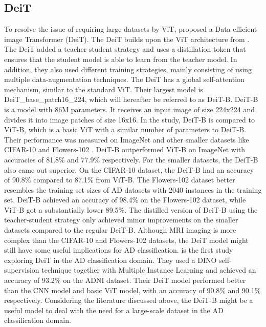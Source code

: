 \documentclass[11pt, a4paper]{article}
\begin{document}
\subsection{DeiT} \label{subs:deit}
To resolve the issue of requiring large datasets by ViT, \cite{Touvron2021TrainingAttention} proposed a Data efficient image Transformer (DeiT). The DeiT builds upon the ViT architecture from \cite{Dosovitskiy2020AnScale}. The DeiT added a teacher-student strategy and uses a distillation token that ensures that the student model is able to learn from the teacher model. In addition, they also used different training strategies, mainly consisting of using multiple data-augmentation techniques. The DeiT has a global self-attention mechanism, similar to the standard ViT. Their largest model is DeiT\_base\_patch16\_224, which will hereafter be referred to as DeiT-B. DeiT-B is a model with 86M parameters. It receives an input image of size 224x224 and divides it into image patches of size 16x16. In the study, DeiT-B is compared to ViT-B, which is a basic ViT with a similar number of parameters to DeiT-B. Their performance was measured on ImageNet and other smaller datasets like CIFAR-10 and Flowers-102 \citep{Krizhevsky2009LearningImages,Nilsback2008AutomatedClasses}. DeiT-B outperformed ViT-B on ImageNet with accuracies of 81.8\% and 77.9\% respectively. For the smaller datasets, the DeiT-B also came out superior. On the CIFAR-10 dataset, the DeiT-B had an accuracy of 90.8\% compared to 87.1\% from ViT-B. The Flowers-102 dataset better resembles the training set sizes of AD datasets with 2040 instances in the training set. DeiT-B achieved an accuracy of 98.4\% on the Flowers-102 dataset, while ViT-B got a substantially lower 89.5\%. The distilled version of DeiT-B using the teacher-student strategy only achieved minor improvements on the smaller datasets compared to the regular DeiT-B. Although MRI imaging is more complex than the CIFAR-10 and Flowers-102 datasets, the DeiT model might still have some useful implications for AD classification.
\cite{Yin2022SMIL-DeiT:MultipleClassification} is the first study exploring DeiT in the AD classification domain. They used a DINO self-supervision technique together with Multiple Instance Learning and achieved an accuracy of 93.2\% on the ADNI dataset. Their DeiT model performed better than the CNN model and basic ViT model, with an accuracy of 90.8\% and 90.1\% respectively.
Considering the literature discussed above, the DeiT-B might be a useful model to deal with the need for a large-scale dataset in the AD classification domain.
\end{document}
